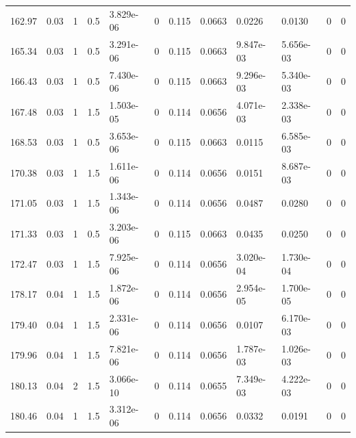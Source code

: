 \documentclass[preview]{standalone}
\begin{document}
{{{\begin{tabular}{L{1.2cm}C{1.2cm} C{0.3cm}C{0.5cm} C{1.4cm}C{1.4cm} C{1.4cm}C{1.4cm} C{1.6cm}C{1.6cm} C{1.6cm}C{1.6cm}}
  162.97  &  0.03  & 1     & 0.5 &  3.829e-06  & 0  &  0.115&   0.0663& 0.0226 & 0.0130   &  0 & 0  \\ 
  165.34  &  0.03  & 1     & 0.5 &  3.291e-06  & 0  &  0.115&   0.0663& 9.847e-03 & 5.656e-03   &  0 & 0  \\ 
  166.43  &  0.03  & 1     & 0.5 &  7.430e-06  & 0  &  0.115&   0.0663& 9.296e-03 & 5.340e-03   &  0 & 0  \\ 
  167.48  &  0.03  & 1     & 1.5 &  1.503e-05  & 0  &  0.114&   0.0656& 4.071e-03 & 2.338e-03   &  0 & 0  \\ 
  168.53  &  0.03  & 1     & 0.5 &  3.653e-06  & 0  &  0.115&   0.0663& 0.0115 & 6.585e-03   &  0 & 0  \\ 
  170.38  &  0.03  & 1     & 1.5 &  1.611e-06  & 0  &  0.114&   0.0656& 0.0151 & 8.687e-03   &  0 & 0  \\ 
  171.05  &  0.03  & 1     & 1.5 &  1.343e-06  & 0  &  0.114&   0.0656& 0.0487 & 0.0280   &  0 & 0  \\ 
  171.33  &  0.03  & 1     & 0.5 &  3.203e-06  & 0  &  0.115&   0.0663& 0.0435 & 0.0250   &  0 & 0  \\ 
  172.47  &  0.03  & 1     & 1.5 &  7.925e-06  & 0  &  0.114&   0.0656& 3.020e-04 & 1.730e-04   &  0 & 0  \\ 
  178.17  &  0.04  & 1     & 1.5 &  1.872e-06  & 0  &  0.114&   0.0656& 2.954e-05 & 1.700e-05   &  0 & 0  \\ 
  179.40  &  0.04  & 1     & 1.5 &  2.331e-06  & 0  &  0.114&   0.0656& 0.0107 & 6.170e-03   &  0 & 0  \\ 
  179.96  &  0.04  & 1     & 1.5 &  7.821e-06  & 0  &  0.114&   0.0656& 1.787e-03 & 1.026e-03   &  0 & 0  \\ 
  180.13  &  0.04  & 2     & 1.5 &  3.066e-10  & 0  &  0.114&   0.0655& 7.349e-03 & 4.222e-03   &  0 & 0  \\ 
  180.46  &  0.04  & 1     & 1.5 &  3.312e-06  & 0  &  0.114&   0.0656& 0.0332 & 0.0191   &  0 & 0  \\ 
\hline 
\end{tabular} 

}}}
\end{document}
